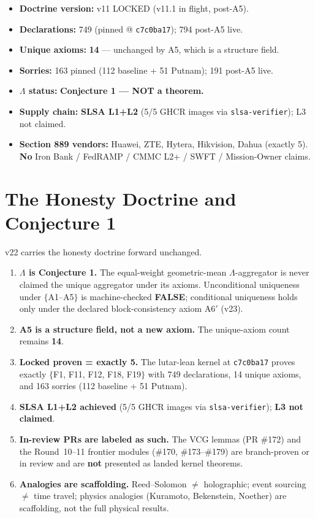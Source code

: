 \documentclass[11pt]{article}
\theoremstyle{plain}
\theoremstyle{definition}
\theoremstyle{remark}
\newcommand{\La}{\Lambda}
\begin{document}
\begin{itemize}[leftmargin=1.4em]
\item \textbf{Doctrine version:} v11 LOCKED (v11.1 in flight, post-A5).
\item \textbf{Declarations:} 749 (pinned @ \texttt{c7c0ba17}); 794 post-A5 live.
\item \textbf{Unique axioms:} \textbf{14} --- unchanged by A5, which is a structure field.
\item \textbf{Sorries:} 163 pinned (112 baseline + 51 Putnam); 191 post-A5 live.
\item \textbf{$\La$ status:} \textbf{Conjecture 1 --- NOT a theorem.}
\item \textbf{Supply chain:} \textbf{SLSA L1+L2} (5/5 GHCR images via \texttt{slsa-verifier}); L3 not claimed.
\item \textbf{Section 889 vendors:} Huawei, ZTE, Hytera, Hikvision, Dahua (exactly 5). \textbf{No} Iron Bank / FedRAMP / CMMC L2+ / SWFT / Mission-Owner claims.
\end{itemize}

\section{The Honesty Doctrine and Conjecture 1}

v22 carries the honesty doctrine forward unchanged.
\begin{enumerate}[leftmargin=1.4em]
\item \textbf{$\La$ is Conjecture 1.} The equal-weight geometric-mean $\La$-aggregator
is never claimed the unique aggregator under its axioms. Unconditional uniqueness
under $\{$A1--A5$\}$ is machine-checked \textbf{FALSE}; conditional uniqueness holds
only under the declared block-consistency axiom A6$'$ (v23).
\item \textbf{A5 is a structure field, not a new axiom.} The unique-axiom count remains \textbf{14}.
\item \textbf{Locked proven = exactly 5.} The lutar-lean kernel at \texttt{c7c0ba17}
proves exactly $\{$F1, F11, F12, F18, F19$\}$ with 749 declarations, 14 unique axioms,
and 163 sorries (112 baseline + 51 Putnam).
\item \textbf{SLSA L1+L2 achieved} (5/5 GHCR images via \texttt{slsa-verifier}); \textbf{L3 not claimed}.
\item \textbf{In-review PRs are labeled as such.} The VCG lemmas (PR \#172) and the
Round~10--11 frontier modules (\#170, \#173--\#179) are branch-proven or in review
and are \textbf{not} presented as landed kernel theorems.
\item \textbf{Analogies are scaffolding.} Reed--Solomon $\neq$ holographic; event
sourcing $\neq$ time travel; physics analogies (Kuramoto, Bekenstein, Noether) are
scaffolding, not the full physical results.
\end{enumerate}
\end{document}
